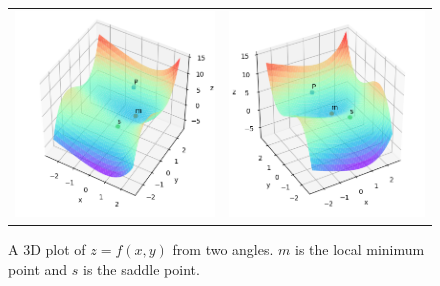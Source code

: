 \documentclass[a4paper]{article}
\begin{document}
\begin{figure}[h]
	\centering
	\begin{tabular}{cc}
		\includegraphics[scale=0.6]{Q2d-1} &
		\includegraphics[scale=0.6]{Q2d-2}
	\end{tabular}
	\caption{A 3D plot of $z=f(x,y)$ from two angles. $m$ is the local minimum point and $s$ is the saddle point.}
	\label{fig:3d-plot}
\end{figure}
\end{document}
